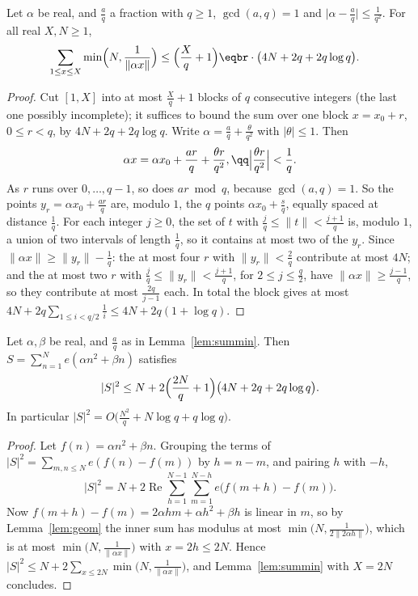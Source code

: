 \begin{lemma}\label{lem:summin}
Let $\alpha$ be real, and $\frac aq$ a fraction with $q\ge1$, $\gcd(a,q)=1$ and $\bigl|\alpha-\frac aq\bigr|\le\frac1{q^2}$. For all real $X,N\ge1$,
\[
\begin{aligned}\sum_{1\le x\le X}\min\Bigl(N,\frac1{\|\alpha x\|}\Bigr)&\le\Bigl(\frac Xq+1\Bigr)\eqbr\cdot\bigl(4N+2q+2q\log q\bigr).\end{aligned}
\]
\end{lemma}

\begin{proof}
Cut $[1,X]$ into at most $\frac Xq+1$ blocks of $q$ consecutive integers (the last one possibly incomplete); it suffices to bound the sum over one block $x=x_0+r$, $0\le r<q$, by $4N+2q+2q\log q$. Write
$\alpha=\frac aq+\frac\theta{q^2}$ with $|\theta|\le1$. Then
\[
\alpha x=\alpha x_0+\frac{ar}q+\frac{\theta r}{q^2},\qq\Bigl|\frac{\theta r}{q^2}\Bigr|<\frac1q.
\]
As $r$ runs over $0,\dots,q-1$, so does $ar\bmod q$, because $\gcd(a,q)=1$. So the points $y_r=\alpha x_0+\frac{ar}q$ are, modulo $1$, the $q$ points $\alpha x_0+\frac sq$, equally spaced at distance $\frac1q$. For each
integer $j\ge0$, the set of $t$ with $\frac jq\le\|t\|<\frac{j+1}q$ is, modulo $1$, a union of two intervals of length $\frac1q$, so it contains at most two of the $y_r$. Since $\|\alpha x\|\ge\|y_r\|-\frac1q$: the at most
four $r$ with $\|y_r\|<\frac2q$ contribute at most $4N$; and the at most two $r$ with $\frac jq\le\|y_r\|<\frac{j+1}q$, for $2\le j\le\frac q2$, have $\|\alpha x\|\ge\frac{j-1}q$, so they contribute at most $\frac{2q}{j-1}$
each. In total the block gives at most $4N+2q\sum_{1\le i<q/2}\frac1i\le4N+2q(1+\log q)$.
\end{proof}

\begin{theorem}\label{thm:weylineq}
Let $\alpha,\beta$ be real, and $\frac aq$ as in Lemma~\ref{lem:summin}. Then $S=\sum_{n=1}^Ne(\alpha n^2+\beta n)$ satisfies
\[
|S|^2\le N+2\Bigl(\frac{2N}q+1\Bigr)\bigl(4N+2q+2q\log q\bigr).
\]
In particular $|S|^2=O\bigl(\frac{N^2}q+N\log q+q\log q\bigr)$.
\end{theorem}

\begin{proof}
Let $f(n)=\alpha n^2+\beta n$. Grouping the terms of $|S|^2=\sum_{m,n\le N}e(f(n)-f(m))$ by $h=n-m$, and pairing $h$ with $-h$,
\[
|S|^2=N+2\operatorname{Re}\sum_{h=1}^{N-1}\sum_{m=1}^{N-h}e\bigl(f(m+h)-f(m)\bigr).
\]
Now $f(m+h)-f(m)=2\alpha hm+\alpha h^2+\beta h$ is linear in $m$, so by Lemma~\ref{lem:geom} the inner sum has modulus at most $\min\bigl(N,\frac1{2\|2\alpha h\|}\bigr)$, which is at most $\min\bigl(N,\frac1{\|\alpha x\|}\bigr)$ with $x=2h\le2N$. Hence
$|S|^2\le N+2\sum_{x\le2N}\min\bigl(N,\frac1{\|\alpha x\|}\bigr)$, and Lemma~\ref{lem:summin} with $X=2N$ concludes.
\end{proof}


